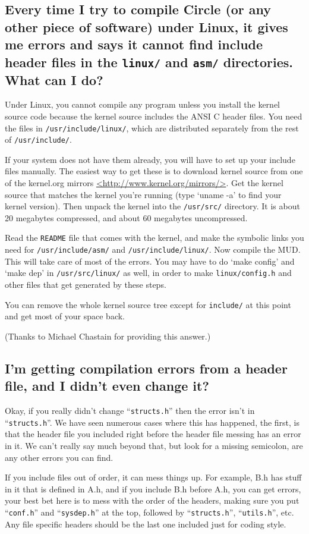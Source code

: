 \documentclass[11pt]{article}
\begin{document}
\subsection{Every time I try to compile Circle (or any other piece of software) under Linux, it gives me errors and says it cannot find include header files in the \texttt{linux/} and \texttt{asm/} directories.  What can I do?}
Under Linux, you cannot compile any program unless you install the kernel source code because the kernel source includes the ANSI C header files.  You need the files in \texttt{/usr/include/linux/}, which are distributed separately from the rest of \texttt{/usr/include/}. 
\par
If your system does not have them already, you will have to set up your include files manually. The easiest way to get these is to download kernel source from one of the kernel.org mirrors
\url{<http://www.kernel.org/mirrors/>}. Get the kernel source that matches the kernel you're running (type `uname -a' to find your kernel version).  Then unpack the kernel into the \texttt{/usr/src/} directory.  It is about 20 megabytes compressed, and about 60 megabytes uncompressed. 
\par
Read the \texttt{README} file that comes with the kernel, and make the symbolic links you need for \texttt{/usr/include/asm/} and \texttt{/usr/include/linux/}. Now compile the MUD.  This will take care of most of the errors.  You may have to do `make config' and `make dep' in \texttt{/usr/src/linux/} as well, in order to make \texttt{linux/config.h} and other files that get generated by these steps. 
\par
You can remove the whole kernel source tree except for \texttt{include/} at this point and get most of your space back. 
\par
(Thanks to Michael Chastain for providing this answer.)

\subsection{I'm getting compilation errors from a header file, and I didn't even change it?}
Okay, if you really didn't change ``\texttt{structs.h}'' then the error isn't in ``\texttt{structs.h}''.  We have seen numerous cases where this has happened, the first, is that the header file you included right before the header file messing has an error in it.  We can't really say much beyond that, but look for a missing semicolon, are any other errors you can find.
\par
If you include files out of order, it can mess things up.  For example, B.h has stuff in it that is defined in A.h, and if you include B.h before A.h, you can get errors, your best bet here is to mess with the order of the headers, making sure you put ``\texttt{conf.h}'' and ``\texttt{sysdep.h}'' at the top, followed by ``\texttt{structs.h}'', ``\texttt{utils.h}'', etc.  Any file specific headers should be the last one included just for coding style.
\end{document}
